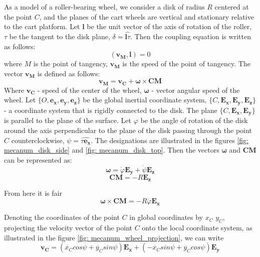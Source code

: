 \documentclass[oneside,final,14pt]{extreport}
\newcommand{\bs}{\boldsymbol}
\begin{document}
\begin{figure} [H]
\end{figure}

 As a model of a roller-bearing wheel, we consider a disk of radius $ R $ centered at the point $ C $, and the planes of the cart wheels are vertical and stationary relative to the cart platform. Let $ \bs{l} $ be the unit vector of the axis of rotation of the roller, $ \tau $ be the tangent to the disk plane, $ \delta = \widehat{\bs{l} \tau} $. Then the coupling equation is written as follows:
\begin{equation}
(
\bs{v_{M}}
,
\bs{l}
)
=
0
\end{equation}
where $ M $ is the point of tangency, $ \bs{v_{M}} $ is the speed of the point of tangency. The vector $ \bs{v_{M}} $ is defined as follows:
\begin{equation}
\bs{v_{M}}
=
\bs{v_{C}}
+
\bs{\omega}
\times
\bs{CM}
\end{equation}
Where
$ \bs{v_{C}} $ -
speed of the center of the wheel, $ \bs{\omega} $ - vector angular speed of the wheel.
Let $ \{O, \bs{e_{x}}, \bs{e_{y}}, \bs{e_{z}} \} $ be the global inertial coordinate system, $ \{C, \bs{E_{x}}, \bs{E_{y}}, \bs{E_{z}} \} $ - a coordinate system that is rigidly connected to the disk. The plane $ \{C, \bs{E_{x}}, \bs{E_{y}} \} $ is parallel to the plane of the surface. Let $ \varphi $ be the angle of rotation of the disk around the axis perpendicular to the plane of the disk passing through the point $ C $ counterclockwise, $ \psi = \widehat{\tau \bs{e_{x}}} $. The designations are illustrated in the figures \ref{fig: mecanum_disk_side} and \ref{fig: mecanum_disk_top}. Then the vectors $ \bs{\omega} $ and $ \bs{CM} $ can be represented as:
\begin{equation}
\bs{\omega}
=
\dot{\varphi}
\bs{E_{y}}
+
\dot{\psi}
\bs{E_{z}}
\end{equation}
\begin{equation}
\bs{CM}
=
-R
\bs{E_{z}}
\end{equation}

From here it is fair
\begin{equation}
\bs{\omega}
\times
\bs{CM}
=
-R \dot{\varphi}
\bs{E_{x}}
\end{equation}

Denoting the coordinates of the point $ C $ in global coordinates by $ x_{C} $ $ y_{C} $, projecting the velocity vector of the point $ C $ onto the local coordinate system, as illustrated in the figure \ref{fig: mecanum_wheel_projection}, we can write
\begin{equation}
\label{eq: velocity_c_projection}
\bs{v_{C}}
=
(
\dot{x_{C}}
cos \psi
+
\dot{y_{C}}
sin \psi
)
\bs{E_{x}}
+
(
- \dot{x_{C}}
sin \psi
+
\dot{y_{C}}
cos \psi
)
\bs{E_{y}}
\end{equation}
\end{document}
